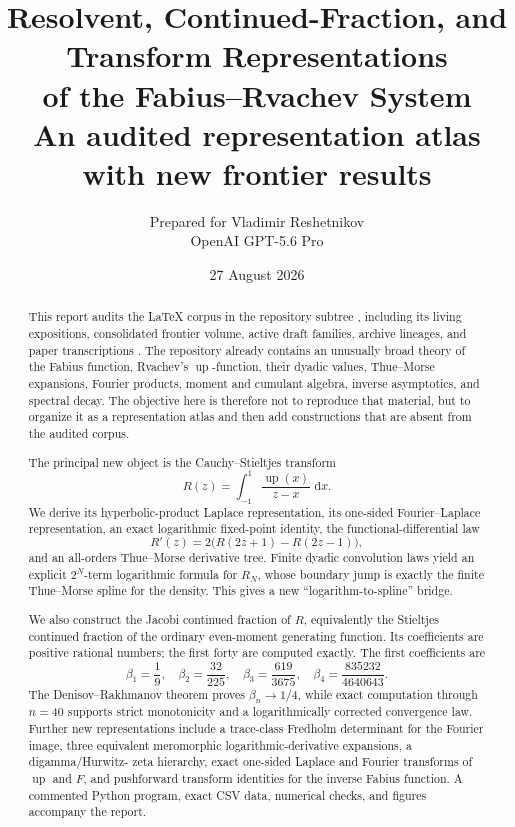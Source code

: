 \documentclass[11pt]{article}
\title{\textbf{Resolvent, Continued-Fraction, and Transform Representations\\
       of the Fabius--Rvachev System}\\[5pt]
       \large An audited representation atlas with new frontier results}
\author{Prepared for Vladimir Reshetnikov\\
        OpenAI GPT-5.6 Pro}
\date{27 August 2026}
\theoremstyle{definition}
\theoremstyle{remark}
\newcommand{\dd}{\,\mathrm d}
\newcommand{\Up}{\operatorname{up}}
\begin{document}
\maketitle

\begin{abstract}
This report audits the LaTeX corpus in the repository subtree
, including its living expositions, consolidated frontier
volume, active draft families, archive lineages, and paper transcriptions \cite{Repository}.  The repository already contains an unusually
broad theory of the Fabius function, Rvachev's \(\Up\)-function, their dyadic values,
Thue--Morse expansions, Fourier products, moment and cumulant algebra, inverse asymptotics,
and spectral decay.  The objective here is therefore not to reproduce that material, but to
organize it as a representation atlas and then add constructions that are absent from the
audited corpus.

The principal new object is the Cauchy--Stieltjes transform
\[
 R(z)=\int_{-1}^{1}\frac{\Up(x)}{z-x}\,\dd x.
\]
We derive its hyperbolic-product Laplace representation, its one-sided Fourier--Laplace
representation, an exact logarithmic fixed-point identity, the functional-differential law
\[
 R'(z)=2\bigl(R(2z+1)-R(2z-1)\bigr),
\]
and an all-orders Thue--Morse derivative tree.  Finite dyadic convolution laws yield an
explicit \(2^N\)-term logarithmic formula for \(R_N\), whose boundary jump is exactly the
finite Thue--Morse spline for the density.  This gives a new ``logarithm-to-spline'' bridge.

We also construct the Jacobi continued fraction of \(R\), equivalently the Stieltjes
continued fraction of the ordinary even-moment generating function.  Its coefficients are
positive rational numbers; the first forty are computed exactly.  The first coefficients are
\[
 \beta_1=\frac19,\quad \beta_2=\frac{32}{225},\quad
 \beta_3=\frac{619}{3675},\quad
 \beta_4=\frac{835232}{4640643}.
\]
The Denisov--Rakhmanov theorem proves \(\beta_n\to1/4\), while exact computation through
\(n=40\) supports strict monotonicity and a logarithmically corrected convergence law.
Further new representations include a trace-class Fredholm determinant for the Fourier
image, three equivalent meromorphic logarithmic-derivative expansions, a digamma/Hurwitz-
zeta hierarchy, exact one-sided Laplace and Fourier transforms of \(\Up\) and \(F\), and
pushforward transform identities for the inverse Fabius function.  A commented Python
program, exact CSV data, numerical checks, and figures accompany the report.
\end{abstract}
\end{document}
